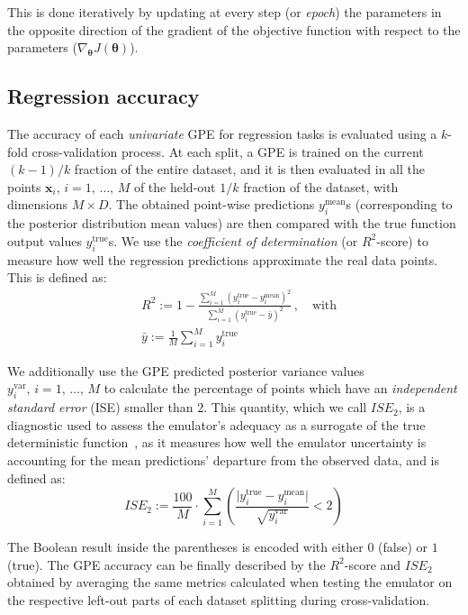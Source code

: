 \noindent
This is done iteratively by updating at every step (or \textit{epoch}) the parameters in the opposite direction of the gradient of the objective function with respect to the parameters ($\nabla_{\boldsymbol{\theta}}J(\boldsymbol{\theta})$).


%
%
%
\subsection{Regression accuracy}
The accuracy of each \textit{univariate} GPE for regression tasks is evaluated using a $k$-fold cross-validation process. At each split, a GPE is trained on the current $(k-1)/k$ fraction of the entire dataset, and it is then evaluated in all the points $\mathbf{x}_i,\,i=1,\,\dots,\,M$ of the held-out $1/k$ fraction of the dataset, with dimensions $M\times D$. The obtained point-wise predictions $y_{i}^{\textrm{mean}}$s (corresponding to the posterior distribution mean values) are then compared with the true function output values $y_{i}^{\textrm{true}}$s. We use the \textit{coefficient of determination} (or $R^2$-score) to measure how well the regression predictions approximate the real data points. This is defined as:
%
\begin{align}
    & R^2 := 1 - \frac{\sum_{i=1}^M(y_{i}^{\textrm{true}}-y_{i}^{\textrm{mean}})^2}{\sum_{i=1}^M(y_{i}^{\textrm{true}} - \bar{y})^2}\,,\quad\text{with} \\
    & \bar{y}:=\frac{1}{M}\sum_{i=1}^M y_{i}^{\textrm{true}}
\end{align}

\noindent
We additionally use the GPE predicted posterior variance values $y_{i}^{\textrm{var}},\,i=1,\,\dots,\,M$ to calculate the percentage of points which have an \textit{independent standard error} (\acs{ISE}) smaller than $2$. This quantity, which we call $ISE_2$, is a diagnostic used to assess the emulator's adequacy as a surrogate of the true deterministic function~\cite{Bastos:2009}, as it measures how well the emulator uncertainty is accounting for the mean predictions' departure from the observed data, and is defined as:
%
\begin{equation}
    ISE_2 := \frac{100}{M}\cdot \sum_{i=1}^M\left(\frac{\vert y_{i}^{\textrm{true}}-y_{i}^{\textrm{mean}}\vert}{\sqrt{y_{i}^{\textrm{var}}}} < 2\right)
\end{equation}

\noindent
The Boolean result inside the parentheses is encoded with either $0$ (false) or $1$ (true). The GPE accuracy can be finally described by the $R^2$-score and $ISE_2$ obtained by averaging the same metrics calculated when testing the emulator on the respective left-out parts of each dataset splitting during cross-validation.

